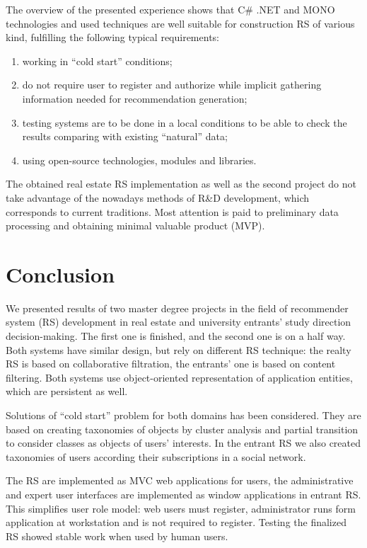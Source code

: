 \documentclass[conference,a4]{IEEEtran}
\begin{document}
The overview of the presented experience shows that C\# .NET and MONO technologies and used techniques are well suitable for construction RS of various kind, fulfilling the following typical requirements:
\begin{enumerate}
\item working in ``cold start'' conditions;
\item do not require user to register and authorize while implicit gathering information needed for recommendation generation;
\item testing systems are to be done in a local conditions to be able to check the results comparing with existing ``natural'' data;
\item using open-source technologies, modules and libraries.
\end{enumerate}

The obtained real estate RS implementation as well as the second project do not take advantage of the nowadays methods of R\&D development, which corresponds to current traditions.  Most attention is paid to preliminary data processing and obtaining minimal valuable product (MVP).

\section{Conclusion}
\label{sec:conc}

We presented results of two master degree projects in the field of recommender system (RS) development in real estate and university entrants' study direction decision-making.  The first one is finished, and the second one is on a half way.  Both systems have similar design, but rely on different RS technique: the realty RS is based on collaborative filtration, the entrants' one is based on content filtering.  Both systems use object-oriented representation of application entities, which are persistent as well.

Solutions of ``cold start'' problem for both domains has been considered.  They are based on creating taxonomies of objects by cluster analysis and partial transition to consider classes as objects of users' interests.  In the entrant RS we also created taxonomies of users according their subscriptions in a social network.

The RS are implemented as MVC web applications for users, the administrative and expert user interfaces are implemented as window applications in entrant RS.  This simplifies user role model: web users must register, administrator runs form application at workstation and is not required to register.  Testing the finalized RS showed stable work when used by human users.
\end{document}
